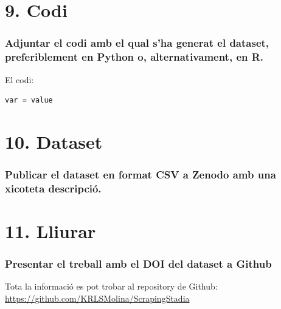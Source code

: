 \documentclass[]{article}
\begin{document}
\hypertarget{codi}{%
\section{9. Codi}\label{codi}}

\hypertarget{adjuntar-el-codi-amb-el-qual-sha-generat-el-dataset-preferiblement-en-python-o-alternativament-en-r.}{%
\subsubsection{Adjuntar el codi amb el qual s'ha generat el dataset,
preferiblement en Python o, alternativament, en
R.}\label{adjuntar-el-codi-amb-el-qual-sha-generat-el-dataset-preferiblement-en-python-o-alternativament-en-r.}}

El codi:

\begin{verbatim}
var = value
\end{verbatim}

\hypertarget{dataset}{%
\section{10. Dataset}\label{dataset}}

\hypertarget{publicar-el-dataset-en-format-csv-a-zenodo-amb-una-xicoteta-descripciuxf3.}{%
\subsubsection{Publicar el dataset en format CSV a Zenodo amb una
xicoteta
descripció.}\label{publicar-el-dataset-en-format-csv-a-zenodo-amb-una-xicoteta-descripciuxf3.}}

\hypertarget{lliurar}{%
\section{11. Lliurar}\label{lliurar}}

\hypertarget{presentar-el-treball-amb-el-doi-del-dataset-a-github}{%
\subsubsection{Presentar el treball amb el DOI del dataset a
Github}\label{presentar-el-treball-amb-el-doi-del-dataset-a-github}}

Tota la informació es pot trobar al repository de Github:
\url{https://github.com/KRLSMolina/ScrapingStadia}
\end{document}
